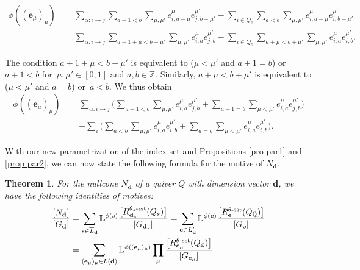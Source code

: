 \documentclass[pdftex]{sigma}
\numberwithin{equation}{section}
\newtheorem{Theorem}{Theorem}[section]
\theoremstyle{definition}
\begin{document}
\begin{align*}
\phi((\mathbf{e}_\mu)_\mu) &= \sum_{\alpha\colon i \rightarrow j} \sum_{a+1 <b}\sum_{\mu,\mu'} e^\mu_{i,a-\mu} e^{\mu'}_{j,b-\mu'} - \sum_{ i \in Q_0} \sum_{a < b}\sum_{\mu,\mu'} e^\mu_{i,a-\mu} e^{\mu'}_{i,b-\mu'} \\
&= \sum_{\alpha\colon i \rightarrow j} \sum_{a+1+\mu <b+\mu'}\sum_{\mu,\mu'} e^\mu_{i,a} e^{\mu'}_{j,b} - \sum_{ i \in Q_0} \sum_{a+\mu < b+\mu'}\sum_{\mu,\mu'} e^\mu_{i,a} e^{\mu'}_{i,b}.
\end{align*}


The condition $a+1+\mu < b+\mu' $ is equivalent to ($\mu < \mu'$ and $ a+1=b$) or $a+1<b$ for~${\mu, \mu' \in [0,1]}$ and $a,b \in \mathbb{Z}$. Similarly, $a+\mu<b+\mu'$ is equivalent to ($\mu < \mu'$ and $ a=b$) or~${a<b}$.
We thus obtain
\begin{align*}
\phi((\mathbf{e}_{\mu})_{\mu}) ={}& \sum_{\alpha\colon i \rightarrow j} \biggl(\sum_{a+1 < b} \sum_{\mu, \mu'} e_{i,a}^{\mu} e_{j,b}^{\mu'} + \sum_{a+1 = b} \sum_{\mu < \mu'} e_{i,a}^{\mu} e_{j,b}^{\mu'}\biggr) \\
&- \sum_{i} \biggl(\sum_{a < b} \sum_{\mu, \mu'} e_{i,a}^{\mu} e_{i,b}^{\mu'} + \sum_{a = b} \sum_{\mu < \mu'} e_{i,a}^{\mu} e_{i,b}^{\mu'}\biggr) .
\end{align*}

With our new parametrization of the index set and Propositions \ref{pro par1} and \ref{prop par2}, we can now state the following formula for the motive of $N_{\mathbf{d}}$.

\begin{Theorem} \label{theo mot}
For the nullcone $N_{\mathbf{d}}$ of a quiver $Q$ with dimension vector $\mathbf{d}$, we have the following identities of motives:
\begin{align*}
\begin{split}
\frac{[N_{\mathbf{d}}]}{[G_{\mathbf{d}}]}
&= \sum_{s \in \overline{L}_{\mathbf{d}}} \mathbb{L}^{\phi(s)} \frac{\big[R^{\theta_s\text{\rm -sst}}_{\mathbf{d}_s}(Q_s)\big]}{[G_{\mathbf{d}_s}]} = \sum_{\mathbf{e} \in L'_{\mathbf{d}}} \mathbb{L}^{\phi(\mathbf{e})} \frac{\big[R_{\mathbf{e}}^{\theta\text{\rm -sst}}(Q_{\mathbb{Q}})\big]}{[G_{\mathbf{e}}]} \\
&= \sum_{(\mathbf{e}_\mu)_\mu\in L(\mathbf{d})} \mathbb{L}^{\phi((\mathbf{e}_\mu)_\mu)}\prod_{\mu} \frac{\big[R_{\mathbf{e}_{\mu}}^{\theta\text{\rm -sst}} (Q_{\mathbb{Z}})\big]}{[G_{\mathbf{e}_{\mu}}]} .
\end{split}
\end{align*}
\end{Theorem}
\end{document}
